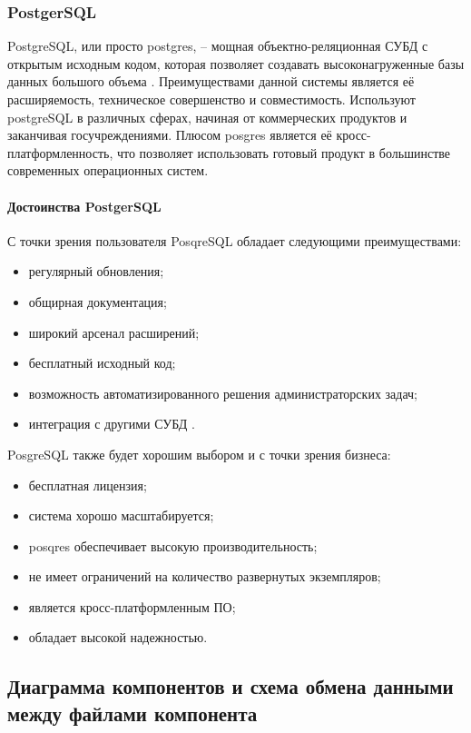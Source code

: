 \subsubsection{PostgerSQL} 


PostgreSQL, или просто postgres, –  мощная объектно-реляционная СУБД с открытым исходным кодом, которая позволяет создавать высоконагруженные базы данных большого объема \cite{postgrestermin}. Преимуществами данной системы является её расширяемость, техническое совершенство и совместимость. Используют postgreSQL в различных сферах, начиная от коммерческих продуктов и заканчивая госучреждениями. Плюсом posgres является её кросс-платформленность, что позволяет использовать готовый продукт в большинстве современных операционных систем.


\paragraph{Достоинства PostgerSQL}
С точки зрения пользователя PosqreSQL обладает следующими преимуществами:
\begin{itemize}
 	\item регулярный обновления;
 	\item общирная документация;
 	\item широкий арсенал расширений;
 	\item бесплатный исходный код;
 	\item возможность автоматизированного решения администраторских задач;
 	\item интеграция с другими СУБД \cite{postgres}.
\end{itemize}
PosgreSQL также будет хорошим выбором и с точки зрения бизнеса:
\begin{itemize}
	\item бесплатная лицензия;
	\item система хорошо масштабируется;
	\item posqres обеспечивает высокую производительность;
	\item не имеет ограничений на количество развернутых экземпляров;
	\item является кросс-платформленным ПО;
	\item обладает высокой надежностью.
\end{itemize}	
	


\subsection{Диаграмма компонентов и схема обмена данными между файлами компонента}

